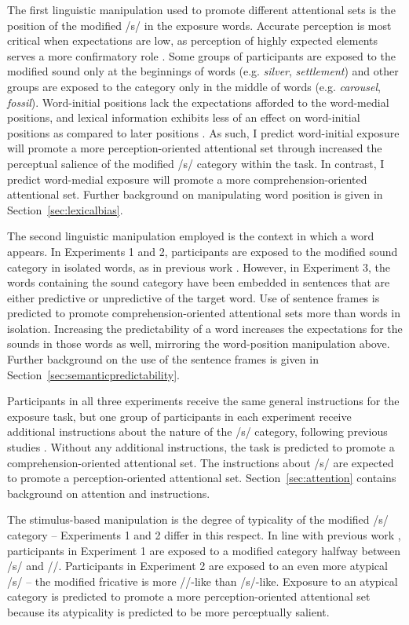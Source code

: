 The first linguistic manipulation used to promote different attentional sets is the position of the modified /s/ in the exposure words.  
Accurate perception is most critical when expectations are low, as perception of highly expected elements serves a more confirmatory role \citep{Marslen-Wilson1978, Gow1995}.
Some groups of participants are exposed to the modified sound only at the beginnings of words (e.g. \emph{silver}, \emph{settlement}) and other groups are exposed to the category only in the middle of words (e.g. \emph{carousel}, \emph{fossil}).
Word-initial positions lack the expectations afforded to the word-medial positions, and lexical information exhibits less of an effect on word-initial positions as compared to later positions \citep{Pitt2006}.
As such, I predict word-initial exposure will promote a more perception-oriented attentional set through increased the perceptual salience of the modified /s/ category within the task.
In contrast, I predict word-medial exposure will promote a more comprehension-oriented attentional set.
Further background on manipulating word position is given in Section~\ref{sec:lexicalbias}.

The second linguistic manipulation employed is the context in which a word appears.  
In Experiments 1 and 2, participants are exposed to the modified sound category in isolated words, as in previous work \citep{Norris2003}.  
However, in Experiment 3, the words containing the sound category have been embedded in sentences that are either predictive or unpredictive of the target word.
Use of sentence frames is predicted to promote comprehension-oriented attentional sets more than words in isolation.
Increasing the predictability of a word increases the expectations for the sounds in those words as well, mirroring the word-position manipulation above.
Further background on the use of the sentence frames is given in Section~\ref{sec:semanticpredictability}.

Participants in all three experiments receive the same general instructions for the exposure task, but one group of participants in each experiment receive additional instructions about the nature of the /s/ category, following previous studies \citep{Pitt2012}.
Without any additional instructions, the task is predicted to promote a comprehension-oriented attentional set.
The instructions about /s/ are expected to promote a perception-oriented attentional set.
Section~\ref{sec:attention} contains background on attention and instructions.

The stimulus-based manipulation is the degree of typicality of the modified /s/ category -- Experiments 1 and 2 differ in this respect. 
In line with previous work \citep{Norris2003}, participants in Experiment 1 are exposed to a modified category halfway between /s/ and /\textesh/. 
Participants in Experiment 2 are exposed to an even more atypical /s/ -- the modified fricative is more /\textesh/-like than /s/-like.  
Exposure to an atypical category is predicted to promote a more perception-oriented attentional set because its atypicality is predicted to be more perceptually salient.

